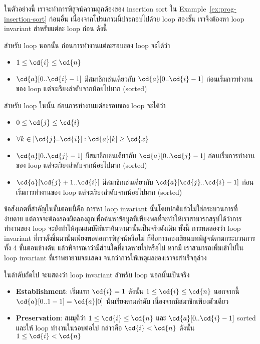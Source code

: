 \begin{example}
ในตัวอย่างนี้ เราจะทำการพิสูจน์ความถูกต้องของ insertion sort ใน Example~\ref{ex:prog-insertion-sort} \enskip ก่อนอื่น เนื่องจากโปรแกรมนี้ประกอบไปด้วย loop สองชั้น เราจึงต้องหา loop invariant สำหรับแต่ละ loop ก่อน ดังนี้

สำหรับ loop นอกนั้น ก่อนการทำงานแต่ละรอบของ loop จะได้ว่า
\begin{itemize}
\item $1\leq\cd{i}\leq\cd{n}$
\item $\cd{a}[0..\cd{i}-1]$ มีสมาชิกเช่นเดียวกับ $\cd{a}[0..\cd{i}-1]$ ก่อนเริ่มการทำงานของ loop แต่จะเรียงลำดับจากน้อยไปมาก (sorted)
\end{itemize}

สำหรับ loop ในนั้น ก่อนการทำงานแต่ละรอบของ loop จะได้ว่า
\begin{itemize}
\item $0\leq\cd{j}\leq\cd{i}$
\item $\forall k\in[\cd{j}..\cd{i}]: \cd{a}[k]\geq\cd{x}$
\item $\cd{a}[0..\cd{j}-1]$ มีสมาชิกเช่นเดียวกับ $\cd{a}[0..\cd{j}-1]$ ก่อนเริ่มการทำงานของ loop แต่จะเรียงลำดับจากน้อยไปมาก (sorted)
\item $\cd{a}[\cd{j}+1..\cd{i}]$ มีสมาชิกเช่นเดียวกับ $\cd{a}[\cd{j}..\cd{i}-1]$ ก่อนเริ่มการทำงานของ loop แต่จะเรียงลำดับจากน้อยไปมาก (sorted)
\end{itemize}

ข้อสังเกตที่สำคัญในขั้นตอนนี้คือ การหา loop invariant นั้นโดยปกติแล้วไม่ใช่กระบวนการที่ง่ายดาย แต่อาจจะต้องลองผิดลองถูกเพื่อค้นหาข้อมูลที่เพียงพอที่จะทำให้เราสามารถสรุปได้ว่าการทำงานของ loop จะยังทำให้คุณสมบัติที่เราค้นหามานั้นเป็นจริงดังเดิม \enskip ทั้งนี้ การทดลองว่า loop invariant ที่เราตั้งขึ้นมานั้นเพียงพอต่อการพิสูจน์หรือไม่ ก็คือการลองเขียนบทพิสูจน์ตามกระบวนการทั้ง 4 ขั้นตอนข้างต้น แล้วพิจารณาว่ามีส่วนใดที่ขาดหายไปหรือไม่ \enskip หากมี เราสามารถเพิ่มเข้าไปใน loop invariant ที่เราพยายามจะแสดง จนกว่าการให้เหตุผลของเราจะสำเร็จลุล่วง

ในลำดับถัดไป จะแสดงว่า loop invariant สำหรับ loop นอกนั้นเป็นจริง
\begin{itemize}
\item {\bf Establishment}: เริ่มแรก $\cd{i}=1$ ดังนั้น $1\leq\cd{i}\leq\cd{n}$ \enskip นอกจากนี้ $\cd{a}[0..1-1]=\cd{a}[0]$ นั้นเรียงตามลำดับ เนื่องจากมีสมาชิกเพียงตัวเดียว \qquad\yea

\item {\bf Preservation}: สมมุติว่า $1\leq\cd{i}\leq\cd{n}$ และ $\cd{a}[0..\cd{i}-1]$ sorted และให้ loop ทำงานในรอบต่อไป กล่าวคือ $\cd{i}<\cd{n}$ \enskip ดังนั้น $1\leq\cd{i}<\cd{n}$


\end{itemize}
\end{example}

